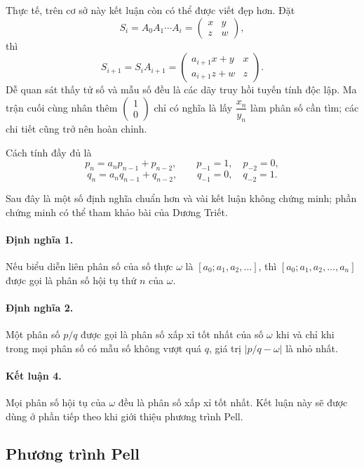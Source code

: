 \documentclass[11pt]{article}
\newcommand{\abs}[1]{\left|#1\right|}
\begin{document}
Thực tế, trên cơ sở này kết luận còn có thể được viết đẹp hơn. Đặt
\[
  S_i=A_0A_1\cdots A_i=\begin{pmatrix}x&y\\z&w\end{pmatrix},
\]
thì
\[
  S_{i+1}=S_iA_{i+1}
  =
  \begin{pmatrix}
    a_{i+1}x+y & x\\
    a_{i+1}z+w & z
  \end{pmatrix}.
\]
Dễ quan sát thấy tử số và mẫu số đều là các dãy truy hồi tuyến tính độc lập.
Ma trận cuối cùng nhân thêm $\begin{pmatrix}1\\0\end{pmatrix}$ chỉ có nghĩa là
lấy $\dfrac{x_n}{y_n}$ làm phân số cần tìm; các chi tiết cũng trở nên hoàn
chỉnh.

Cách tính đầy đủ là
\[
  p_n=a_np_{n-1}+p_{n-2},\qquad p_{-1}=1,\quad p_{-2}=0,
\]
\[
  q_n=a_nq_{n-1}+q_{n-2},\qquad q_{-1}=0,\quad q_{-2}=1.
\]

Sau đây là một số định nghĩa chuẩn hơn và vài kết luận không chứng minh; phần
chứng minh có thể tham khảo bài của Dương Triết.

\paragraph{Định nghĩa 1.}
Nếu biểu diễn liên phân số của số thực $\omega$ là
$[a_0;a_1,a_2,\ldots]$, thì $[a_0;a_1,a_2,\ldots,a_n]$ được gọi là phân số hội
tụ thứ $n$ của $\omega$.

\paragraph{Định nghĩa 2.}
Một phân số $p/q$ được gọi là phân số xấp xỉ tốt nhất của số $\omega$ khi và
chỉ khi trong mọi phân số có mẫu số không vượt quá $q$, giá trị
$\abs{p/q-\omega}$ là nhỏ nhất.

\paragraph{Kết luận 4.}
Mọi phân số hội tụ của $\omega$ đều là phân số xấp xỉ tốt nhất. Kết luận này
sẽ được dùng ở phần tiếp theo khi giới thiệu phương trình Pell.

\subsection{Phương trình Pell}
\end{document}
